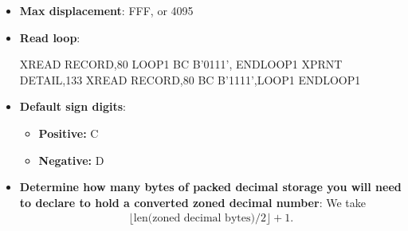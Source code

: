 \documentclass{report}
\begin{document}
\begin{itemize}
        \item \textbf{Max displacement}: FFF, or 4095
        \item \textbf{Read loop}:
            \bigbreak \noindent 
            \begin{cppcode}
                        XREAD RECORD,80
                LOOP1   BC    B'0111', ENDLOOP1
                        XPRNT DETAIL,133
                        XREAD RECORD,80
                        BC    B'1111',LOOP1
                        ENDLOOP1
                    \end{cppcode}
        \item \textbf{Default sign digits}:
            \begin{itemize}
                \item \textbf{Positive:} C
                \item \textbf{Negative:} D
            \end{itemize}
        \item \textbf{Determine how many bytes of packed decimal storage you will need to declare to hold a converted zoned decimal number}: We take
            \begin{align*}
                \lfloor\text{len(zoned decimal bytes)}/2\rfloor + 1
            .\end{align*}


\end{itemize}
\end{document}
